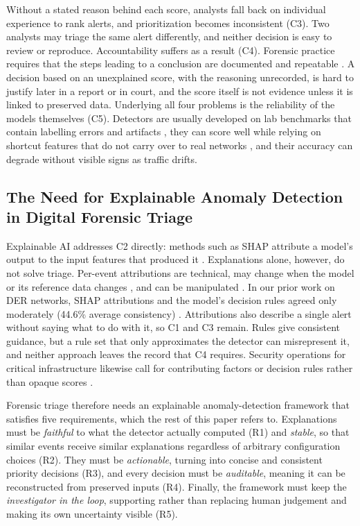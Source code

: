 \documentclass[journal]{IEEEtran}
\begin{document}
Without a stated reason behind each score, analysts fall back on individual experience to rank alerts, and prioritization becomes inconsistent (C3). Two analysts may triage the same alert differently, and neither decision is easy to review or reproduce. Accountability suffers as a result (C4). Forensic practice requires that the steps leading to a conclusion are documented and repeatable \cite{nist}. A decision based on an unexplained score, with the reasoning unrecorded, is hard to justify later in a report or in court, and the score itself is not evidence unless it is linked to preserved data. Underlying all four problems is the reliability of the models themselves (C5). Detectors are usually developed on lab benchmarks that contain labelling errors and artifacts \cite{engelen}, they can score well while relying on shortcut features that do not carry over to real networks \cite{trustee,arp}, and their accuracy can degrade without visible signs as traffic drifts.

\subsection{The Need for Explainable Anomaly Detection in Digital Forensic Triage}
Explainable AI addresses C2 directly: methods such as SHAP attribute a model's output to the input features that produced it \cite{shap}. Explanations alone, however, do not solve triage. Per-event attributions are technical, may change when the model or its reference data changes \cite{warnecke}, and can be manipulated \cite{fooling}. In our prior work on DER networks, SHAP attributions and the model's decision rules agreed only moderately (44.6\% average consistency) \cite{excyder}. Attributions also describe a single alert without saying what to do with it, so C1 and C3 remain. Rules give consistent guidance, but a rule set that only approximates the detector can misrepresent it, and neither approach leaves the record that C4 requires. Security operations for critical infrastructure likewise call for contributing factors or decision rules rather than opaque scores \cite{gridsoc}.

Forensic triage therefore needs an explainable anomaly-detection framework that satisfies five requirements, which the rest of this paper refers to. Explanations must be \emph{faithful} to what the detector actually computed (R1) and \emph{stable}, so that similar events receive similar explanations regardless of arbitrary configuration choices (R2). They must be \emph{actionable}, turning into concise and consistent priority decisions (R3), and every decision must be \emph{auditable}, meaning it can be reconstructed from preserved inputs (R4). Finally, the framework must keep the \emph{investigator in the loop}, supporting rather than replacing human judgement and making its own uncertainty visible (R5).
\end{document}
